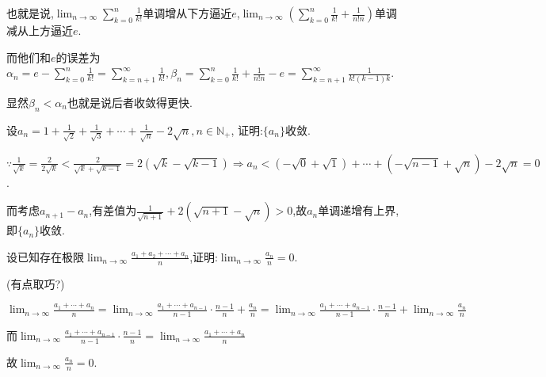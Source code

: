 \begin{exercise}
\begin{enumerate}
\begin{solution}
                       也就是说,$\lim_{n\to\infty}\sum_{k=0}^n\frac{1}{k!}$单调增从下方逼近$e$,$\lim_{n\to\infty}\left(\sum_{k=0}^n\frac{1}{k!}+\frac{1}{n!n}\right)$单调减从上方逼近$e$.

                       而他们和$e$的误差为$\alpha_n=e-\sum_{k=0}^n\frac{1}{k!}=\sum_{k=n+1}^\infty\frac{1}{k!},\beta_n=\sum_{k=0}^n\frac{1}{k!}+\frac{1}{n!n}-e=\sum_{k=n+1}^\infty\frac{1}{k!(k-1)k}$.

                       显然$\beta_n<\alpha_n$也就是说后者收敛得更快.
                   \end{solution}

         \end{enumerate}

     \end{exercise}

     \begin{exercise}
         设$a_n=1+\frac{1}{\sqrt{2}}+\frac{1}{\sqrt{3}}+\cdots+\frac{1}{\sqrt{n}}-2\sqrt{n},n\in \mathbb{N}_+$,
         证明:$\{a_n\}$收敛.
     \end{exercise}
     \begin{solution}
         $\because\frac{1}{\sqrt{k}}=\frac{2}{2\sqrt{k}}<\frac{2}{\sqrt{k}+\sqrt{k-1}}=2\left(\sqrt{k}-\sqrt{k-1}\right)\Rightarrow a_n<\left(-\sqrt{0}+\sqrt{1}\right)+\cdots+\left(-\sqrt{n-1}+\sqrt{n}\right)-2\sqrt{n}=0$.

         而考虑$a_{n+1}-a_n$,有差值为$\frac{1}{\sqrt{n+1}}+2(\sqrt{n+1}-\sqrt{n})>0$,故$a_n$单调递增有上界,即$\{a_n\}$收敛.
     \end{solution}

     \begin{exercise}
         设已知存在极限$\lim_{n\to\infty}\frac{a_1+a_2+\cdots+a_n}{n}$,证明:$\lim_{n\to\infty}\frac{a_n}{n}=0$.
     \end{exercise}
     \begin{solution}
         (有点取巧?)

         $\lim_{n\to\infty}\frac{a_1+\cdots+a_n}{n}=\lim_{n\to\infty}\frac{a_1+\cdots+a_{n-1}}{n-1}\cdot\frac{n-1}{n}+\frac{a_n}{n}=\lim_{n\to\infty}\frac{a_1+\cdots+a_{n-1}}{n-1}\cdot\frac{n-1}{n}+\lim_{n\to\infty}\frac{a_n}{n}$

         而$\lim_{n\to\infty}\frac{a_1+\cdots+a_{n-1}}{n-1}\cdot\frac{n-1}{n}=\lim_{n\to\infty}\frac{a_1+\cdots+a_n}{n}$

         故$\lim_{n\to\infty}\frac{a_n}{n}=0$.
     \end{solution}

